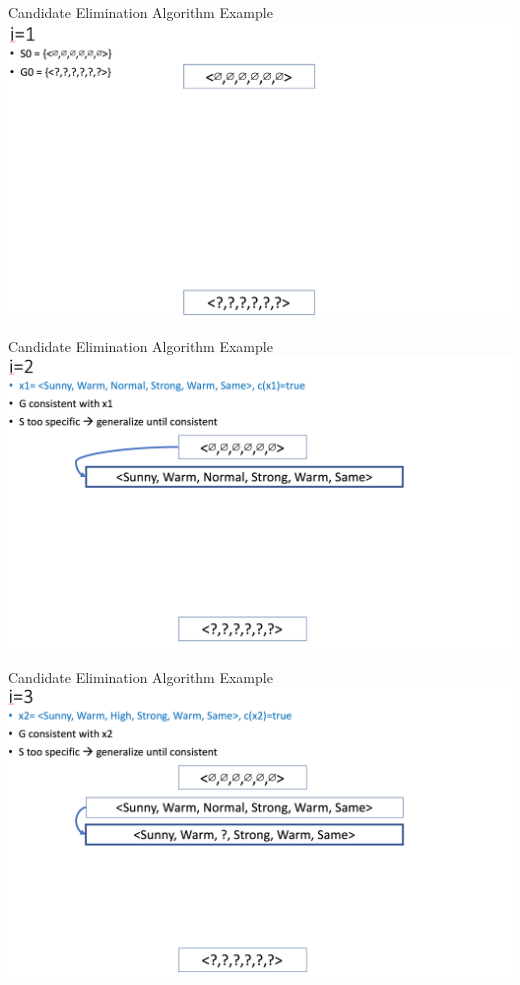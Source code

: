 \documentclass{beamer}
\begin{document}
\begin{frame}{Candidate Elimination Algorithm Example}
\centering
\includegraphics[width=1.1\textwidth]{cea_1}
\end{frame}

\begin{frame}{Candidate Elimination Algorithm Example}
\centering
\includegraphics[width=1.1\textwidth]{cea_2}
\end{frame}

\begin{frame}{Candidate Elimination Algorithm Example}
\centering
\includegraphics[width=1.1\textwidth]{cea_3}
\end{frame}
\end{document}
